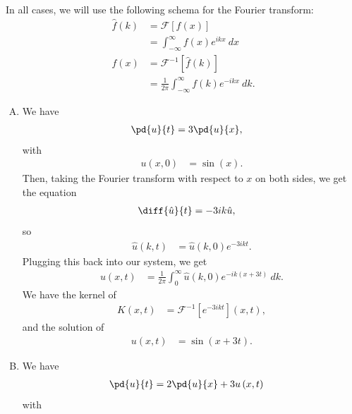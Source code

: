 \documentclass[10pt]{mypackage}
\begin{document}
\RaggedRight
\begin{remark}
  In all cases, we will use the following schema for the Fourier transform:
  \begin{align*}
    \hat{f}(k) &= \mathcal{F}\left[ f(x) \right]\\
               &= \int_{-\infty}^{\infty} f(x)e^{ikx}\:dx\\
    f(x) &= \mathcal{F}^{-1}\left[ \hat{f}(k) \right]\\
         &= \frac{1}{2\pi} \int_{-\infty}^{\infty} f(k)e^{-ikx}\:dk.
  \end{align*}
\end{remark}
\begin{solution}
  \begin{enumerate}[(A)]
    \item We have
      \begin{align*}
        \pd{u}{t} &= 3\pd{u}{x},
      \end{align*}
      with
      \begin{align*}
        u\left( x,0 \right) &= \sin\left( x \right).
      \end{align*}
      Then, taking the Fourier transform with respect to $x$ on both sides, we get the equation
      \begin{align*}
        \diff{\hat{u}}{t} &= -3ik \hat{u},
      \end{align*}
      so
      \begin{align*}
        \hat{u}(k,t) &= \hat{u}(k,0) e^{-3ikt}.
      \end{align*}
      Plugging this back into our system, we get
      \begin{align*}
        u\left( x,t \right) &= \frac{1}{2\pi}\int_{0}^{\infty} \hat{u}(k,0)e^{-ik\left( x+3t \right)}\:dk.
      \end{align*}
      We have the kernel of
      \begin{align*}
        K\left( x,t \right) &= \mathcal{F}^{-1}\left[ e^{-3ikt} \right]\left( x,t \right),
      \end{align*}
      and the solution of
      \begin{align*}
        u\left( x,t \right) &= \sin\left( x+3t \right).
      \end{align*}
    \item We have
      \begin{align*}
        \pd{u}{t} &=  2\pd{u}{x} + 3 u\left( x,t \right)
      \end{align*}
      with

\end{enumerate}
\end{solution}
\end{document}
